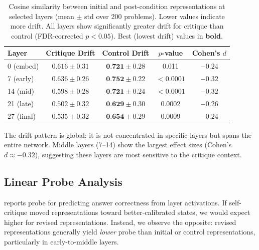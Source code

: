 \begin{table}[t]
    \centering
    \caption{Cosine similarity between initial and post-condition representations at selected layers (mean $\pm$ std over 200 problems). Lower values indicate more drift. All layers show significantly greater drift for critique than control (FDR-corrected $p < 0.05$). Best (lowest drift) values in \textbf{bold}.}
    \begin{tabular}{@{}lcccc@{}}
        \toprule
        \textbf{Layer} & \textbf{Critique Drift} & \textbf{Control Drift} & \textbf{$p$-value} & \textbf{Cohen's $d$} \\
        \midrule
        0 (embed) & $0.616 \pm 0.31$ & $\textbf{0.721} \pm 0.28$ & 0.011 & $-0.24$ \\
        7 (early) & $0.636 \pm 0.26$ & $\textbf{0.752} \pm 0.22$ & $< 0.0001$ & $-0.32$ \\
        14 (mid) & $0.598 \pm 0.28$ & $\textbf{0.721} \pm 0.24$ & $< 0.0001$ & $-0.32$ \\
        21 (late) & $0.502 \pm 0.32$ & $\textbf{0.629} \pm 0.30$ & 0.0002 & $-0.26$ \\
        27 (final) & $0.535 \pm 0.32$ & $\textbf{0.654} \pm 0.29$ & 0.0009 & $-0.24$ \\
        \bottomrule
    \end{tabular}
    \label{tab:drift}
\end{table}

The drift pattern is global: it is not concentrated in specific layers but spans the entire network. Middle layers (7--14) show the largest effect sizes (Cohen's $d \approx -0.32$), suggesting these layers are most sensitive to the critique context.

\subsection{Linear Probe Analysis}
\label{sec:results:probes}

 reports probe \auc for predicting answer correctness from layer activations. If self-critique moved representations toward better-calibrated states, we would expect higher \auc for revised representations. Instead, we observe the opposite: revised representations generally yield \emph{lower} probe \auc than initial or control representations, particularly in early-to-middle layers.

